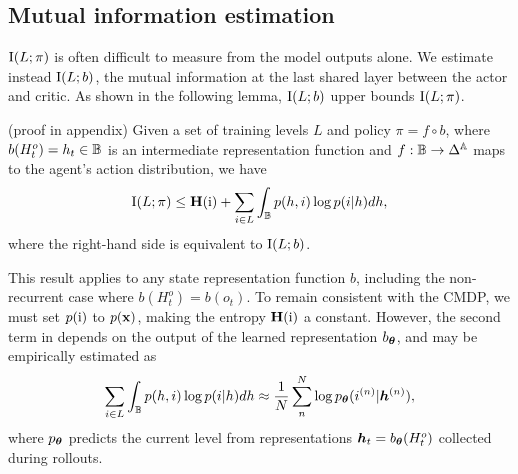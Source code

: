 \subsection{Mutual information estimation}
$\text{I}(L;\pi)$ is often difficult to measure from the model outputs alone. We estimate instead $\text{I}(L;b)$, the mutual information at the last shared layer between the actor and critic. As shown in the following lemma, $\text{I}(L;b)$ upper bounds $\text{I}(L;\pi)$.
%
\begin{lemma} \label{c3:lem:mi_fixed_L}
    (proof in appendix) Given a set of training levels $L$ and policy $\pi = f \circ b$, where $b(H^o_t) = h_t \in {\mathbb{B}}$ is an intermediate representation function and $f : {\mathbb{B}} \rightarrow \Delta^{\mathbb{A}}$ maps to the agent's action distribution, we have
    \begin{align} \label{c3:eq:lemma_result}
        \text{I}(L;\pi) \leq \mathbf{H}({\textnormal{i}}) + \sum_{i\in L} \int_{{\mathbb{B}}} p(h, i) \log p(i|h)dh,
    \end{align}
    where the right-hand side is equivalent to $\text{I}(L;b)$.
\end{lemma}
This result applies to any state representation function $b$, including the non-recurrent case where $b(H^o_t) = b(o_t)$. To remain consistent with the CMDP, we must set $p({\textnormal{i}})$ to $p({\mathbf{x}})$, making the entropy $\mathbf{H}({\textnormal{i}})$ a constant. However, the second term in  %
depends on the output of the learned representation $b_{\bm{\theta}}$, and may be empirically estimated as
%
\begin{equation} \label{c3:eq:mi_empirical_approx}
   \sum_{i\in L} \int_{{\mathbb{B}}} p(h, i) \log p(i|h)dh \approx \frac{1}{N} \sum^{N}_{n} \log p_{\bm{\theta}}(i^{(n)}|{\bm{h}}^{(n)}),
\end{equation}
where $p_{\bm{\theta}}$ predicts the current level from representations ${\bm{h}}_t = b_{\bm{\theta}} (H_t^o)$ collected during rollouts.

